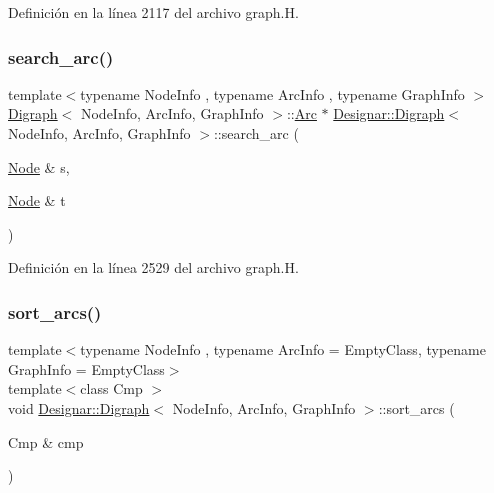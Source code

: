 Definición en la línea 2117 del archivo graph.\+H.

\mbox{\label{class_designar_1_1_digraph_ac301ebe5d45b2864639d68d7e9aeea2a}} 
\subsubsection{\texorpdfstring{search\+\_\+arc()}{search\_arc()}}
{\footnotesize\ttfamily template$<$typename Node\+Info , typename Arc\+Info , typename Graph\+Info $>$ \\
\hyperlink{class_designar_1_1_digraph}{Digraph}$<$ Node\+Info, Arc\+Info, Graph\+Info $>$\+::\hyperlink{class_designar_1_1_digraph_a0ceb278671f2a535c00fddccdeafd69f}{Arc} $\ast$ \hyperlink{class_designar_1_1_digraph}{Designar\+::\+Digraph}$<$ Node\+Info, Arc\+Info, Graph\+Info $>$\+::search\+\_\+arc (\begin{DoxyParamCaption}\item[{\hyperlink{class_designar_1_1_digraph_a4dc921c41a480b7946a04170e997d8ae}{Node} \&}]{s,  }\item[{\hyperlink{class_designar_1_1_digraph_a4dc921c41a480b7946a04170e997d8ae}{Node} \&}]{t }\end{DoxyParamCaption})}



Definición en la línea 2529 del archivo graph.\+H.

\mbox{\label{class_designar_1_1_digraph_a450085493969a382371f7d4d407e42cd}} 
\subsubsection{\texorpdfstring{sort\+\_\+arcs()}{sort\_arcs()}\hspace{0.1cm}{\footnotesize\ttfamily [1/2]}}
{\footnotesize\ttfamily template$<$typename Node\+Info , typename Arc\+Info  = Empty\+Class, typename Graph\+Info  = Empty\+Class$>$ \\
template$<$class Cmp $>$ \\
void \hyperlink{class_designar_1_1_digraph}{Designar\+::\+Digraph}$<$ Node\+Info, Arc\+Info, Graph\+Info $>$\+::sort\+\_\+arcs (\begin{DoxyParamCaption}\item[{Cmp \&}]{cmp }\end{DoxyParamCaption})\hspace{0.3cm}{\ttfamily [inline]}}



